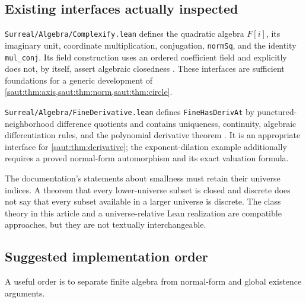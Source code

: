 \documentclass[11pt]{article}
\theoremstyle{definition}
\theoremstyle{remark}
\numberwithin{equation}{section}
\begin{document}
\subsection{Existing interfaces actually inspected}

\texttt{Surreal/Algebra/Complexify.lean} defines the quadratic algebra
$F[i]$, its imaginary unit, coordinate multiplication, conjugation,
\texttt{normSq}, and the identity \texttt{mul\_conj}. Its field construction
uses an ordered coefficient field and explicitly does not, by itself,
assert algebraic closedness \cite{RepoComplexify}.
These interfaces are sufficient foundations for a generic development of
\cref{saut:thm:axis,saut:thm:norm,saut:thm:circle}.

\texttt{Surreal/Algebra/FineDerivative.lean} defines
\texttt{FineHasDerivAt} by punctured-neighborhood difference quotients and
contains uniqueness, continuity, algebraic differentiation rules, and the
polynomial derivative theorem \cite{RepoFine}. It is an appropriate
interface for \cref{saut:thm:derivative}; the exponent-dilation example additionally
requires a proved normal-form automorphism and its exact valuation formula.

The documentation's statements about smallness must retain their universe
indices. A theorem that every lower-universe subset is closed and discrete
does not say that every subset available in a larger universe is discrete.
The class theory in this article and a universe-relative Lean realization
are compatible approaches, but they are not textually interchangeable.

\subsection{Suggested implementation order}

A useful order is to separate finite algebra from normal-form and global
existence arguments.
\end{document}

